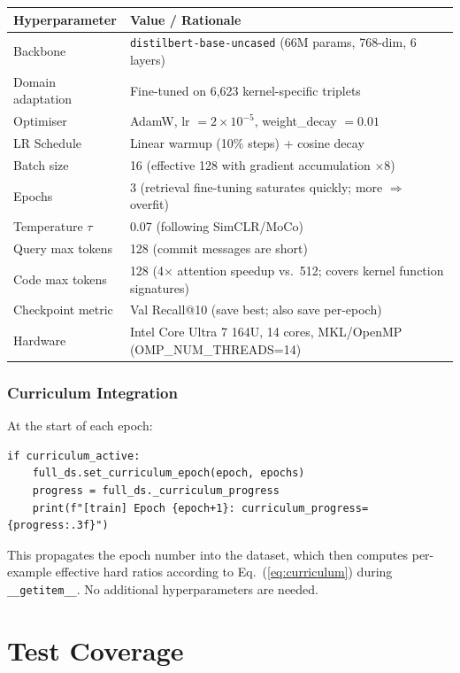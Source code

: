 \documentclass[11pt,a4paper]{article}
\begin{document}
\begin{center}
\begin{tabular}{@{}ll@{}}
\toprule
\textbf{Hyperparameter} & \textbf{Value / Rationale} \\
\midrule
Backbone & \texttt{distilbert-base-uncased} (66M params, 768-dim, 6 layers) \\
Domain adaptation & Fine-tuned on 6{,}623 kernel-specific triplets \\
Optimiser & AdamW, lr $= 2\!\times\!10^{-5}$, weight\_decay $= 0.01$ \\
LR Schedule & Linear warmup (10\% steps) + cosine decay \\
Batch size & 16 (effective 128 with gradient accumulation $\times 8$) \\
Epochs & 3 (retrieval fine-tuning saturates quickly; more $\Rightarrow$ overfit) \\
Temperature $\tau$ & 0.07 (following SimCLR/MoCo) \\
Query max tokens & 128 (commit messages are short) \\
Code max tokens & 128 (4$\times$ attention speedup vs.\ 512; covers kernel function signatures) \\
Checkpoint metric & Val Recall@10 (save best; also save per-epoch) \\
Hardware & Intel Core Ultra 7 164U, 14 cores, MKL/OpenMP (OMP\_NUM\_THREADS=14) \\
\bottomrule
\end{tabular}
\end{center}

\subsubsection{Curriculum Integration}

At the start of each epoch:
\begin{lstlisting}
if curriculum_active:
    full_ds.set_curriculum_epoch(epoch, epochs)
    progress = full_ds._curriculum_progress
    print(f"[train] Epoch {epoch+1}: curriculum_progress={progress:.3f}")
\end{lstlisting}

This propagates the epoch number into the dataset, which then computes
per-example effective hard ratios according to Eq.~(\ref{eq:curriculum})
during \texttt{\_\_getitem\_\_}. No additional hyperparameters are needed.

\section{Test Coverage}
\label{sec:tests}
\end{document}
